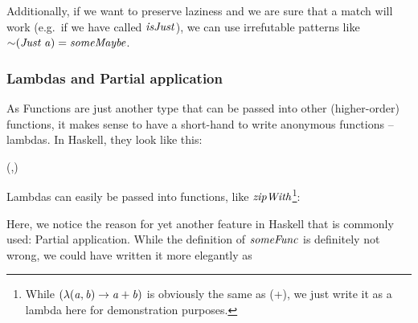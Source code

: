 \documentclass[paper=A4,twoside=true,openright,parskip=full,chapterprefix=true,headings=normal,bibliography=totoc,listof=totoc,titlepage=on,captions=tableabove,draft=false,british]{scrreprt}%
\begin{document}
Additionally, if we want to preserve laziness and we are sure that a
match will work (e.g.~if we have called \ensuremath{\Varid{isJust}}), we can use
irrefutable patterns like \ensuremath{\mathord{\sim}(\Conid{Just}\;\Varid{a})\mathrel{=}\Varid{someMaybe}}.

\hypertarget{lambdas-and-partial-application}{%
\subsubsection{Lambdas and Partial
application}\label{lambdas-and-partial-application}}

As Functions are just another type that can be passed into other
(higher-order) functions, it makes sense to have a short-hand to write
anonymous functions -- lambdas. In Haskell, they look like this:


\begin{hscode}\SaveRestoreHook
{}%
%
\>[B]{}\lambda (,)\to {}\mathbin{+}\<[E]%
\ColumnHook
\end{hscode}\resethooks
\vspace{-2\baselineskip}

Lambdas can easily be passed into functions, like \ensuremath{\Varid{zipWith}}\footnote{While
  \ensuremath{(\lambda (\Varid{a},\Varid{b})\to \Varid{a}\mathbin{+}\Varid{b})} is obviously the same as (+), we just write it as
  a lambda here for demonstration purposes.}:


\resethooks
\vspace{-2\baselineskip}

Here, we notice the reason for yet another feature in Haskell that is
commonly used: Partial application. While the definition of \ensuremath{\Varid{someFunc}}
is definitely not wrong, we could have written it more elegantly as


\resethooks
\vspace{-2\baselineskip}
\end{document}

